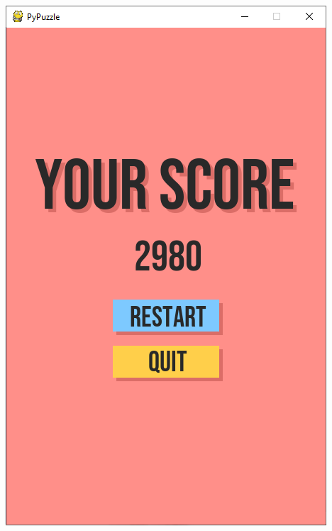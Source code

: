 \documentclass[a4paper]{report}
\begin{document}
\begin{enumerate}
        \includegraphics[scale=0.3]{images/4-end.png}

\end{enumerate}
\end{document}
